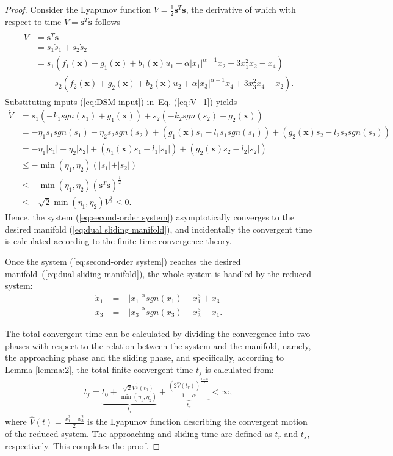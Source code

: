 \documentclass[3p]{elsarticle}
\theoremstyle{plain}
\theoremstyle{remark}
\begin{document}
\begin{proof}
Consider the Lyapunov function $V=\frac{1}{2}{\bm s}^T\bm s$, the derivative of which with respect to time $\dot V = {\bm s}^T \bm {\dot s}$ follows
\begin{align}
\begin{split}
\dot V &= {\bm s}^T\dot{\bm  s}\\
&=s_1\dot s_1+s_2\dot s_2\\
&=s_1(f_1(\bm x)+g_1(\bm x)+b_1(\bm x)u_1+\alpha\vert x_1\vert^{\alpha-1}x_2+3x_1^2x_2-x_4)\\
&\quad +s_2(f_2(\bm x)+g_2(\bm x)+b_2(\bm x)u_2+\alpha\vert x_3\vert^{\alpha-1}x_4+3x_3^2x_4+x_2).\label{eq:V_1}
\end{split}
\end{align}
Substituting inputs (\ref{eq:DSM input}) in~Eq. (\ref{eq:V_1}) yields
\begin{align*}
\dot V &= s_1(-k_1sgn(s_1)+g_1(\bm x))+s_2(-k_2sgn(s_2)+g_2(\bm x))\\
&= -\eta_1s_1sgn(s_1)-\eta_2s_2sgn(s_2)+(g_1(\bm x)s_1 - l_1s_1sgn(s_1))+(g_2(\bm x)s_2 - l_2s_2sgn(s_2))\\
&= -\eta_1\vert s_1\vert-\eta_2\vert s_2\vert+(g_1(\bm x)s_1 - l_1\vert s_1\vert)+(g_2(\bm x)s_2 - l_2\vert s_2\vert)\\
&\le - \min(\eta_1,\eta_2)(\vert s_1\vert+\vert s_2\vert)\\
&\le -\min(\eta_1,\eta_2)({\bm s}^T\bm s)^\frac{1}{2}\\
&\le -\sqrt{2}\min(\eta_1,\eta_2)V^\frac{1}{2}\le 0.
\end{align*}
Hence, the system (\ref{eq:second-order system}) asymptotically converges to the desired manifold (\ref{eq:dual sliding manifold}), and incidentally the convergent time is calculated according to the finite time convergence theory.\par
Once the system (\ref{eq:second-order system}) reaches the desired manifold~(\ref{eq:dual sliding manifold}), the whole system is handled by the reduced system:
\begin{align*}
\dot x_1&=-\vert x_1\vert^\alpha sgn(x_1)-x_1^3+x_3\\
\dot x_3&=-\vert x_3\vert^\alpha sgn(x_3)-x_3^3-x_1.
\end{align*}\par
The total convergent time can be calculated by dividing the convergence into two phases with respect to the relation between the system and the manifold, namely, the approaching phase and the sliding phase, and specifically, according to Lemma \ref{lemma:2}, the total finite convergent time $t_f$ is calculated from:
\begin{align}
t_f = \underbrace{t_0+\frac{\sqrt{2}V^{\frac{1}{2}}(t_0)}{\min(\eta_1,\eta_2)}}_{t_r}+\underbrace{\frac{(2\hat V(t_r))^{\frac{1-\alpha}{2}}}{1-\alpha}}_{t_s}<\infty,
\end{align}
where $\hat V(t) = \frac{x_1^2+x_3^2}{2}$ is the Lyapunov function describing the convergent motion of the reduced system. The approaching and sliding time are defined as $t_r$ and $t_s$, respectively. This completes the proof.
\end{proof}
\end{document}
